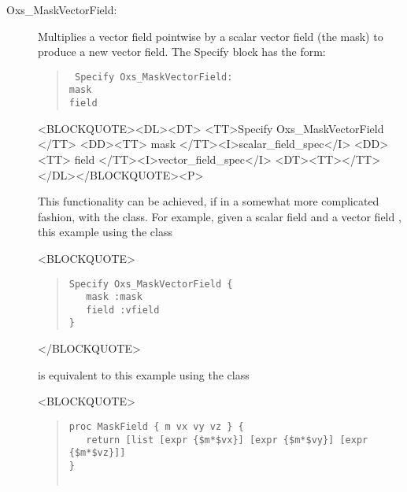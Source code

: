 \begin{description}
%
\item[Oxs\_MaskVectorField:\label{item:MaskVectorField}]
Multiplies a vector field pointwise by a scalar vector field (the mask)
to produce a new vector field.  The Specify block has the form:
\begin{latexonly}
\begin{quote}\tt
Specify Oxs\_MaskVectorField: \ocb\\
 \bi mask  \\
 \bi field \\
\ccb
\end{quote}
\end{latexonly}
\begin{rawhtml}
<BLOCKQUOTE><DL><DT>
<TT>Specify Oxs_MaskVectorField {</TT>
<DD><TT> mask </TT><I>scalar_field_spec</I>
<DD><TT> field </TT><I>vector_field_spec</I>
<DT><TT>}</TT></DL></BLOCKQUOTE><P>
\end{rawhtml}
This functionality can be achieved, if in a somewhat more complicated
fashion, with the
class.  For example, given a scalar field  and a vector field
, this example using the  class
\begin{rawhtml}
<BLOCKQUOTE>
\end{rawhtml}
\begin{quote}
\begin{verbatim}
Specify Oxs_MaskVectorField {
   mask :mask
   field :vfield
}
\end{verbatim}
\end{quote}
\begin{rawhtml}
</BLOCKQUOTE>
\end{rawhtml}
is equivalent to this example using the 
class
\begin{rawhtml}
<BLOCKQUOTE>
\end{rawhtml}
\begin{quote}
\begin{verbatim}
proc MaskField { m vx vy vz } {
   return [list [expr {$m*$vx}] [expr {$m*$vy}] [expr {$m*$vz}]]
}


\end{verbatim}
\end{quote}
\end{description}
